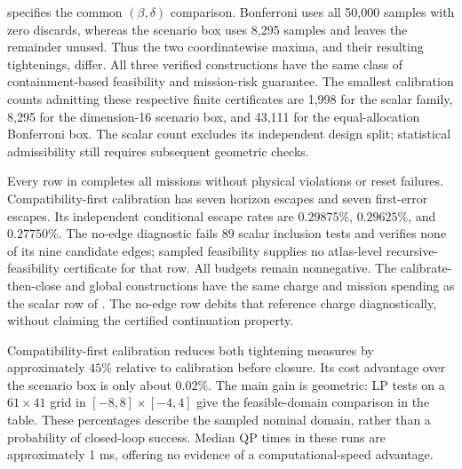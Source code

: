  specifies the common $(\beta,\delta)$ comparison. Bonferroni uses all 50,000 samples with zero discards, whereas the scenario box uses 8,295 samples and leaves the remainder unused. Thus the two coordinatewise maxima, and their resulting tightenings, differ. All three verified constructions have the same class of containment-based feasibility and mission-risk guarantee. The smallest calibration counts admitting these respective finite certificates are 1,998 for the scalar family, 8,295 for the dimension-16 scenario box, and 43,111 for the equal-allocation Bonferroni box. The scalar count excludes its independent design split; statistical admissibility still requires subsequent geometric checks.

\begin{table}[tb]
\ifmarkchanges\color{blue}\else\color{black}\fi\centering\small
\setlength{\tabcolsep}{3pt}
\caption{Benchmark A: 120 missions per row. Horizon is the escape percentage over 2,640 decisions; Test is the largest of three independent context-conditional escape percentages. Tightening and Feas. entries are percentages. Feas. is the stationary-context-weighted fraction of nominally feasible grid states. Every row except the no-edge diagnostic verifies all nine transitions and terminal conditions.}
\label{tab:benchA-results}

\end{table}

Every row in  completes all missions without physical violations or reset failures. Compatibility-first calibration has seven horizon escapes and seven first-error escapes. Its independent conditional escape rates are $0.29875\%$, $0.29625\%$, and $0.27750\%$. The no-edge diagnostic fails 89 scalar inclusion tests and verifies none of its nine candidate edges; sampled feasibility supplies no atlas-level recursive-feasibility certificate for that row. All budgets remain nonnegative. The calibrate-then-close and global constructions have the same charge and mission spending as the scalar row of . The no-edge row debits that reference charge diagnostically, without claiming the certified continuation property.

Compatibility-first calibration reduces both tightening measures by approximately $45\%$ relative to calibration before closure. Its cost advantage over the scenario box is only about $0.02\%$. The main gain is geometric: LP tests on a $61\times41$ grid in $[-8,8]\times[-4,4]$ give the feasible-domain comparison in the table. These percentages describe the sampled nominal domain, rather than a probability of closed-loop success. Median QP times in these runs are approximately 1 ms, offering no evidence of a computational-speed advantage.

